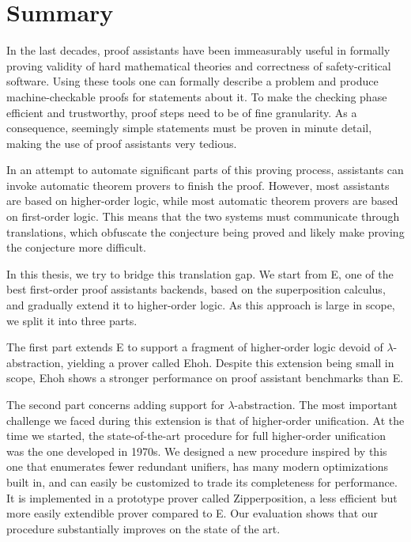 \chapter*{Summary}

In the last decades, proof assistants have been immeasurably useful in formally
proving validity of hard mathematical theories and correctness of
safety-critical software. Using these tools one can formally describe a problem
and produce machine-checkable proofs for statements about it. To make the
checking phase efficient and trustworthy, proof steps need to be of fine
granularity. As a consequence, seemingly simple statements must be proven in
minute detail, making the use of proof assistants very tedious.

In an attempt to automate significant parts of this proving process, assistants
can invoke automatic theorem provers to finish the proof. However, most
assistants are based on higher-order logic, while most automatic theorem provers
are based on first-order logic. This means that the two systems must communicate
through translations, which obfuscate the conjecture being proved and likely
make proving the conjecture more difficult.

In this thesis, we try to bridge this translation gap. We start from E, one of the best
first-order proof assistants backends, based on the superposition calculus, and
gradually extend it to higher-order logic. As this approach is large in scope,
we split it into three parts.

The first part extends E to support a fragment of higher-order logic devoid of
$\lambda$-abstra\-ction, yielding a prover called Ehoh. Despite this extension being small in scope, 
Ehoh shows a stronger performance on proof assistant benchmarks than E.

The second part concerns adding support for $\lambda$-abstraction. The most
important challenge we faced during this extension is that of higher-order
unification. At the time we started, the state-of-the-art procedure
for full higher-order unification was the one developed in 1970s. We designed a new
procedure inspired by this one that enumerates fewer redundant unifiers, has many
modern optimizations built in, and can easily be customized to trade its
completeness for performance. It is implemented in a
prototype prover called Zipperposition, a less efficient but more easily extendible
prover compared to E. Our evaluation shows that our
procedure substantially improves on the state of the art.

